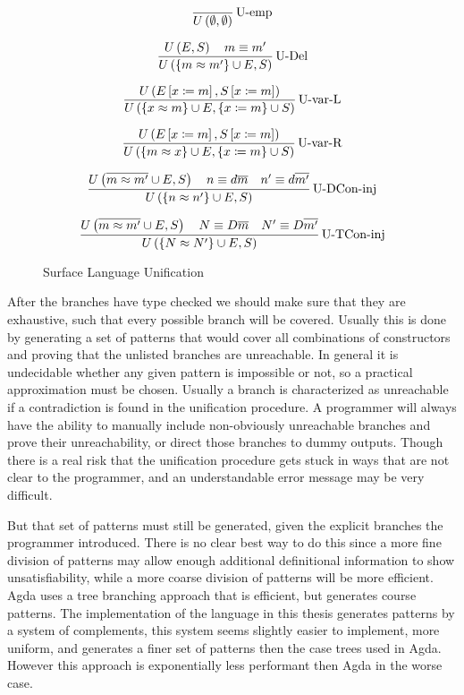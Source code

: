 \begin{figure}
\[
\frac{\,}{U\left(\emptyset,\emptyset\right)
}\operatorname{U-emp}
\]

\[
\frac{U\left(E,S\right)\quad m\equiv m'}{U\left(\left\{ m\approx m'\right\} \cup E,S\right)
}\operatorname{U-Del}
\]

\[
\frac{
  U\left(E\left[x\coloneqq m\right],S\left[x\coloneqq m\right]\right)
}{
  U\left(\left\{ x\approx m\right\} \cup E,\left\{x\coloneqq m\right\} \cup S \right)
}\operatorname{U-var-L}
\]

\[
\frac{
  U\left(E\left[x\coloneqq m\right],S\left[x\coloneqq m\right]\right)
}{
  U\left(\left\{ m\approx x\right\} \cup E, \left\{ x\coloneqq m\right\}  \cup S  \right)
}\operatorname{U-var-R}
\]

\[
\frac{
  U\left(\overline{m\approx m'}\cup E,S\right)\quad n\equiv d\overline{m}\quad n'\equiv d\overline{m'}
}{
  U\left(\left\{ n\approx n'\right\} \cup E,S\right)
}\operatorname{U-DCon-inj}
\]

\[
\frac{
  U\left(\overline{m\approx m'}\cup E,S\right)\quad N\equiv D\overline{m}\quad N'\equiv D\overline{m'}
}{
  U\left(\left\{ N\approx N'\right\} \cup E,S\right)
}\operatorname{U-TCon-inj}
\]
\caption{Surface Language Unification}
\label{fig:surface-data-unification}
\end{figure}
After the branches have type checked we should make sure that they are exhaustive, such that every possible branch will be covered.
Usually this is done by generating a set of patterns that would cover all combinations of constructors and proving that the unlisted branches are unreachable.
In general it is undecidable whether any given pattern is impossible or not, so a practical approximation must be chosen.
Usually a branch is characterized as unreachable if a contradiction is found in the unification procedure.
A programmer will always have the ability to manually include non-obviously unreachable branches and prove their unreachability, or direct those branches to dummy outputs.
Though there is a real risk that the unification procedure gets stuck in ways that are not clear to the programmer, and an understandable error message may be very difficult.

But that set of patterns must still be generated, given the explicit branches the programmer introduced.
There is no clear best way to do this since a more fine division of patterns may allow enough additional definitional information to show unsatisfiability, while a more coarse division of patterns will be more efficient.
Agda uses a tree branching approach that is efficient, but generates course patterns.
The implementation of the language in this thesis generates patterns by a system of complements, this system seems slightly easier to implement, more uniform, and generates a finer set of patterns then the case trees used in Agda.
However this approach is exponentially less performant then Agda in the worse case. 

